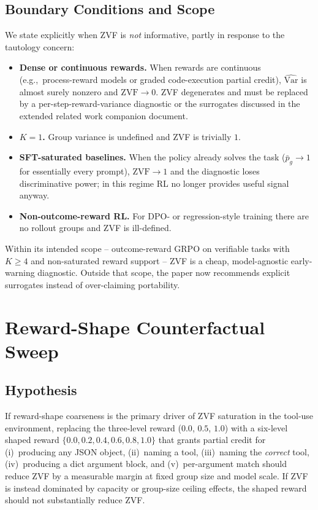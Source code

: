 \documentclass{article}
\begin{document}
\subsection{Boundary Conditions and Scope}

We state explicitly when ZVF is \emph{not} informative, partly in response
to the tautology concern:
\begin{itemize}[leftmargin=1.2em,itemsep=0pt]
  \item \textbf{Dense or continuous rewards.} When rewards are continuous
        (e.g.,~process-reward models or graded code-execution partial credit),
        $\widehat{\mathrm{Var}}$ is almost surely nonzero and
        $\mathrm{ZVF} \to 0$. ZVF degenerates and must be replaced by a
        per-step-reward-variance diagnostic or the surrogates discussed in
        the extended related work companion document.
  \item \textbf{$K=1$.} Group variance is undefined and ZVF is trivially $1$.
  \item \textbf{SFT-saturated baselines.} When the policy already solves
        the task ($\bar p_g \to 1$ for essentially every prompt),
        $\mathrm{ZVF} \to 1$ and the diagnostic loses discriminative power;
        in this regime RL no longer provides useful signal anyway.
  \item \textbf{Non-outcome-reward RL.} For DPO- or regression-style
        training there are no rollout groups and ZVF is ill-defined.
\end{itemize}
Within its intended scope -- outcome-reward GRPO on verifiable tasks with
$K \ge 4$ and non-saturated reward support -- ZVF is a cheap, model-agnostic
early-warning diagnostic. Outside that scope, the paper now recommends
explicit surrogates instead of over-claiming portability.
 

\section{Reward-Shape Counterfactual Sweep}
\label{app:zvf_counterfactual}

\subsection{Hypothesis}
If reward-shape coarseness is the primary driver of ZVF saturation in the
tool-use environment, replacing the three-level reward (\(0.0\), \(0.5\), \(1.0\))
with a six-level shaped reward
\(\{0.0, 0.2, 0.4, 0.6, 0.8, 1.0\}\)
that grants partial credit for (i)~producing any JSON object, (ii)~naming a
tool, (iii)~naming the \emph{correct} tool, (iv)~producing a dict argument
block, and (v)~per-argument match should reduce ZVF by a measurable margin at
fixed group size and model scale. If ZVF is instead dominated by capacity or
group-size ceiling effects, the shaped reward should not substantially reduce
ZVF.
\end{document}
